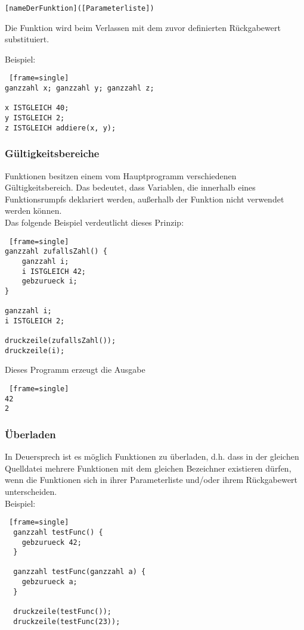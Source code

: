 \documentclass[12pt, a4paper, oneside, ngerman]{article}
\begin{document}
\verb|[nameDerFunktion]([Parameterliste])|

Die Funktion wird beim Verlassen mit dem zuvor definierten Rückgabewert substituiert.

\medskip
\noindent
Beispiel:
\begin{lstlisting} [frame=single] 
ganzzahl x; ganzzahl y; ganzzahl z;

x ISTGLEICH 40;
y ISTGLEICH 2;
z ISTGLEICH addiere(x, y);
\end{lstlisting}

\subsubsection{Gültigkeitsbereiche}
Funktionen besitzen einem vom Hauptprogramm verschiedenen Gültigkeitsbereich. Das bedeutet, dass Variablen, die innerhalb eines Funktionsrumpfs deklariert werden, außerhalb der Funktion nicht verwendet werden können.\\

\medskip
\noindent
Das folgende Beispiel verdeutlicht dieses Prinzip:
\begin{lstlisting} [frame=single] 
ganzzahl zufallsZahl() { 
    ganzzahl i; 
    i ISTGLEICH 42; 
    gebzurueck i; 
} 

ganzzahl i; 
i ISTGLEICH 2; 

druckzeile(zufallsZahl());
druckzeile(i);
\end{lstlisting}

Dieses Programm erzeugt die Ausgabe
\begin{lstlisting} [frame=single] 
42
2
\end{lstlisting}

\subsubsection{Überladen}
In Deuersprech ist es möglich Funktionen zu überladen, d.h. dass in der gleichen Quelldatei mehrere Funktionen mit dem gleichen Bezeichner existieren dürfen, wenn die Funktionen sich in ihrer Parameterliste und/oder ihrem Rückgabewert unterscheiden. \\

\medskip
\noindent
Beispiel:
\begin{lstlisting} [frame=single] 
  ganzzahl testFunc() { 
    gebzurueck 42; 
  } 
  
  ganzzahl testFunc(ganzzahl a) { 
    gebzurueck a; 
  } 
  
  druckzeile(testFunc()); 
  druckzeile(testFunc(23));
\end{lstlisting} 
\end{document}
